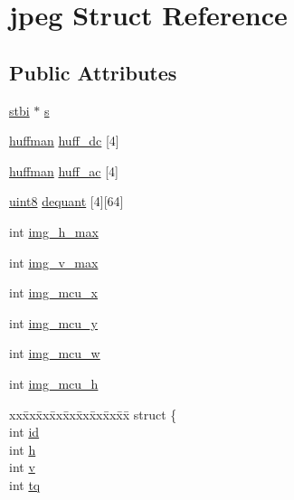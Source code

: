 \hypertarget{structjpeg}{}\section{jpeg Struct Reference}
\label{structjpeg}
\subsection*{Public Attributes}
\begin{DoxyCompactItemize}
\item 
\hyperlink{structstbi}{stbi} $\ast$ \hyperlink{structjpeg_aa1dac6b3ea069114abf0b4021aa3a67e}{s}
\item 
\hyperlink{structhuffman}{huffman} \hyperlink{structjpeg_aae44f91bafcc73fa70544573458abe33}{huff\+\_\+dc} \mbox{[}4\mbox{]}
\item 
\hyperlink{structhuffman}{huffman} \hyperlink{structjpeg_a6fab0b2d90425db5d609edbde8bddd92}{huff\+\_\+ac} \mbox{[}4\mbox{]}
\item 
\hyperlink{stb__image_8c_adde6aaee8457bee49c2a92621fe22b79}{uint8} \hyperlink{structjpeg_aae820981dde2c49bc05b6e1298143d21}{dequant} \mbox{[}4\mbox{]}\mbox{[}64\mbox{]}
\item 
int \hyperlink{structjpeg_af4ed1173241e83f1482a276a178ce9e5}{img\+\_\+h\+\_\+max}
\item 
int \hyperlink{structjpeg_a50690c7d415968f864f4f1c10b85082d}{img\+\_\+v\+\_\+max}
\item 
int \hyperlink{structjpeg_a8a7f2486617a69e9b88c9a161560c8a5}{img\+\_\+mcu\+\_\+x}
\item 
int \hyperlink{structjpeg_afa9d2c991eff0959c0c8b65ab186243b}{img\+\_\+mcu\+\_\+y}
\item 
int \hyperlink{structjpeg_a32f06fea63ec2c976092760b21abad72}{img\+\_\+mcu\+\_\+w}
\item 
int \hyperlink{structjpeg_a6e013436253bcf1e5808a1774b96cc38}{img\+\_\+mcu\+\_\+h}
\item 
\begin{tabbing}
xx\=xx\=xx\=xx\=xx\=xx\=xx\=xx\=xx\=\kill
struct \{\\
\>int \hyperlink{structjpeg_a58dd6e440ef7dc1e23087ec27a864ce6}{id}\\
\>int \hyperlink{structjpeg_a5234104744a9edef60b6080fadd90ebe}{h}\\
\>int \hyperlink{structjpeg_afd4d012a5d0ba3cd039a579e1c76b383}{v}\\
\>int \hyperlink{structjpeg_a881f166abcd414809677939c0b75e6cf}{tq}\\

\end{tabbing}
\end{DoxyCompactItemize}
